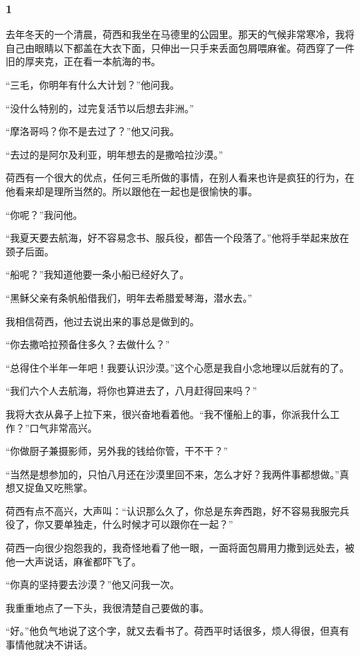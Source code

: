 \subsubsection*{1}
\par 去年冬天的一个清晨，荷西和我坐在马德里的公园里。那天的气候非常寒冷，我将自己由眼睛以下都盖在大衣下面，只伸出一只手来丢面包屑喂麻雀。荷西穿了一件旧的厚夹克，正在看一本航海的书。
\par “三毛，你明年有什么大计划？”他问我。
\par “没什么特别的，过完复活节以后想去非洲。”
\par “摩洛哥吗？你不是去过了？”他又问我。
\par “去过的是阿尔及利亚，明年想去的是撒哈拉沙漠。”
\par 荷西有一个很大的优点，任何三毛所做的事情，在别人看来也许是疯狂的行为，在他看来却是理所当然的。所以跟他在一起也是很愉快的事。
\par “你呢？”我问他。
\par “我夏天要去航海，好不容易念书、服兵役，都告一个段落了。”他将手举起来放在颈子后面。
\par “船呢？”我知道他要一条小船已经好久了。
\par “黑稣父亲有条帆船借我们，明年去希腊爱琴海，潜水去。”
\par 我相信荷西，他过去说出来的事总是做到的。
\par “你去撒哈拉预备住多久？去做什么？”
\par “总得住个半年一年吧！我要认识沙漠。”这个心愿是我自小念地理以后就有的了。
\par “我们六个人去航海，将你也算进去了，八月赶得回来吗？”
\par 我将大衣从鼻子上拉下来，很兴奋地看着他。“我不懂船上的事，你派我什么工作？”口气非常高兴。
\par “你做厨子兼摄影师，另外我的钱给你管，干不干？”
\par “当然是想参加的，只怕八月还在沙漠里回不来，怎么才好？我两件事都想做。”真想又捉鱼又吃熊掌。
\par 荷西有点不高兴，大声叫：“认识那么久了，你总是东奔西跑，好不容易我服完兵役了，你又要单独走，什么时候才可以跟你在一起？”
\par 荷西一向很少抱怨我的，我奇怪地看了他一眼，一面将面包屑用力撒到远处去，被他一大声说话，麻雀都吓飞了。
\par “你真的坚持要去沙漠？”他又问我一次。
\par 我重重地点了一下头，我很清楚自己要做的事。
\par “好。”他负气地说了这个字，就又去看书了。荷西平时话很多，烦人得很，但真有事情他就决不讲话。
